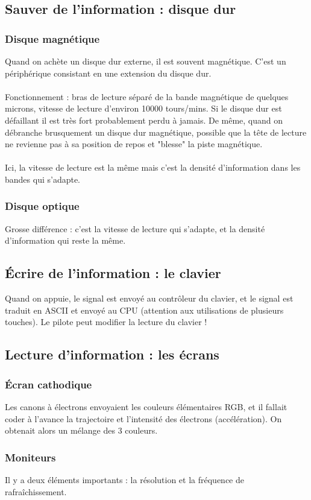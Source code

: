 \documentclass[12pt,a4paper]{report}
\begin{document}
\subsection{Sauver de l'information : disque dur}
\subsubsection{Disque magnétique}
Quand on achète un disque dur externe, il est souvent magnétique. C'est un périphérique consistant en une extension du disque dur. \\
\\
Fonctionnement : bras de lecture séparé de la bande magnétique de quelques microns, vitesse de lecture d'environ 10000 tours/mins. Si le disque dur est défaillant il est très fort probablement perdu à jamais. De même, quand on débranche brusquement un disque dur magnétique, possible que la tête de lecture ne revienne pas à sa position de repos et "blesse" la piste magnétique. \\
\\
Ici, la vitesse de lecture est la même mais c'est la densité d'information dans les bandes qui s'adapte.
\subsubsection{Disque optique}
Grosse différence : c'est la vitesse de lecture qui s'adapte, et la densité d'information qui reste la même.

\subsection{Écrire de l'information : le clavier}
Quand on appuie, le signal est envoyé au contrôleur du clavier, et le signal est traduit en ASCII et envoyé au CPU (attention aux utilisations de plusieurs touches). Le pilote peut modifier la lecture du clavier !
\subsection{Lecture d'information : les écrans}
\subsubsection{Écran cathodique}
Les canons à électrons envoyaient les couleurs élémentaires RGB, et il fallait coder à l'avance la trajectoire et l'intensité des électrons (accélération). On obtenait alors  un mélange des 3 couleurs.
\subsubsection{Moniteurs}
Il y a deux éléments importants : la résolution et la fréquence de rafraîchissement.
\end{document}
